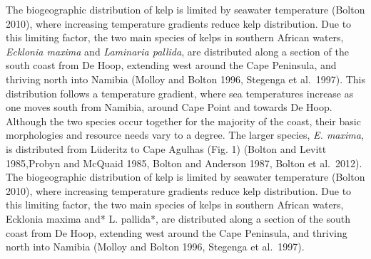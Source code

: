 \documentclass[
]{article}
\begin{document}
The biogeographic distribution of kelp is limited by seawater
temperature (Bolton 2010), where increasing temperature gradients reduce
kelp distribution. Due to this limiting factor, the two main species of
kelps in southern African waters, \emph{Ecklonia maxima} and
\emph{Laminaria pallida}, are distributed along a section of the south
coast from De Hoop, extending west around the Cape Peninsula, and
thriving north into Namibia (Molloy and Bolton 1996, Stegenga et
al.~1997). This distribution follows a temperature gradient, where sea
temperatures increase as one moves south from Namibia, around Cape Point
and towards De Hoop. Although the two species occur together for the
majority of the coast, their basic morphologies and resource needs vary
to a degree. The larger species, \emph{E. maxima}, is distributed from
Lüderitz to Cape Agulhas (Fig. 1) (Bolton and Levitt 1985,Probyn and
McQuaid 1985, Bolton and Anderson 1987, Bolton et al.~2012). The
biogeographic distribution of kelp is limited by seawater temperature
(Bolton 2010), where increasing temperature gradients reduce kelp
distribution. Due to this limiting factor, the two main species of kelps
in southern African waters, Ecklonia maxima and* L. pallida*, are
distributed along a section of the south coast from De Hoop, extending
west around the Cape Peninsula, and thriving north into Namibia (Molloy
and Bolton 1996, Stegenga et al.~1997).
\end{document}

